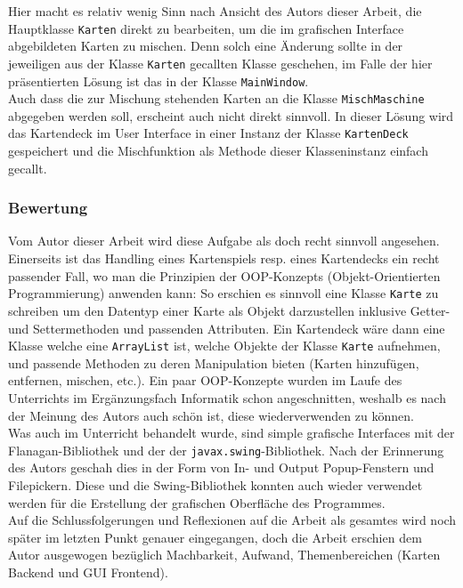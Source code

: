\documentclass[a4paper,11pt]{article}
\begin{document}
Hier macht es relativ wenig Sinn nach Ansicht des Autors dieser Arbeit, die Hauptklasse \texttt{Karten} direkt zu bearbeiten, um die im grafischen Interface abgebildeten Karten zu mischen. Denn solch eine Änderung sollte in der jeweiligen aus der Klasse \texttt{Karten} gecallten Klasse geschehen, im Falle der hier präsentierten Lösung ist das in der Klasse \texttt{MainWindow}.\\

Auch dass die zur Mischung stehenden Karten an die Klasse \texttt{MischMaschine} abgegeben werden soll, erscheint auch nicht direkt sinnvoll. In dieser Lösung wird das Kartendeck im User Interface in einer Instanz der Klasse \texttt{KartenDeck} gespeichert und die Mischfunktion als Methode dieser Klasseninstanz einfach gecallt.



\subsubsection{Bewertung}
Vom Autor dieser Arbeit wird diese Aufgabe als doch recht sinnvoll angesehen. Einerseits ist das Handling eines Kartenspiels resp. eines Kartendecks ein recht passender Fall, wo man die Prinzipien der OOP-Konzepts (Objekt-Orientierten Programmierung) anwenden kann: So erschien es sinnvoll eine Klasse \texttt{Karte} zu schreiben um den Datentyp einer Karte als Objekt darzustellen inklusive Getter- und Settermethoden und passenden Attributen. Ein Kartendeck wäre dann eine Klasse welche eine \texttt{ArrayList} ist, welche Objekte der Klasse \texttt{Karte} aufnehmen, und passende Methoden zu deren Manipulation bieten (Karten hinzufügen, entfernen, mischen, etc.). Ein paar OOP-Konzepte wurden im Laufe des Unterrichts im Ergänzungsfach Informatik schon angeschnitten, weshalb es nach der Meinung des Autors auch schön ist, diese wiederverwenden zu können. \\

Was auch im Unterricht behandelt wurde, sind simple grafische Interfaces mit der Flanagan-Bibliothek und der der \texttt{javax.swing}-Bibliothek. Nach der Erinnerung des Autors geschah dies in der Form von In- und Output Popup-Fenstern und Filepickern. Diese und die Swing-Bibliothek konnten auch wieder verwendet werden für die Erstellung der grafischen Oberfläche des Programmes.\\

Auf die Schlussfolgerungen und Reflexionen auf die Arbeit als gesamtes wird noch später im letzten Punkt genauer eingegangen, doch die Arbeit erschien dem Autor ausgewogen bezüglich Machbarkeit, Aufwand, Themenbereichen (Karten Backend und GUI Frontend).
\end{document}
